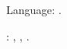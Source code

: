 \documentclass[ngerman]{article}
\begin{document}
Language: \languagename.

\unitname: \weightunit, \lengthunit, \currencyunit.
\end{document}
